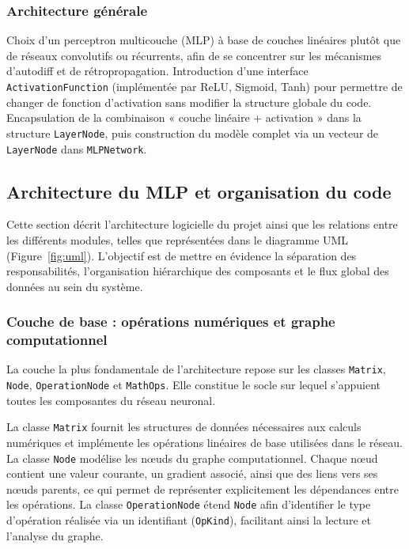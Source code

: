 \documentclass[a4paper,11pt]{article}
\begin{document}
\subsubsection{Architecture générale}
Choix d'un perceptron multicouche (MLP) à base de couches linéaires plutôt que de réseaux convolutifs ou récurrents, afin de se concentrer sur les mécanismes d'autodiff et de rétropropagation. Introduction d'une interface \texttt{ActivationFunction} (implémentée par ReLU, Sigmoid, Tanh) pour permettre de changer de fonction d'activation sans modifier la structure globale du code. Encapsulation de la combinaison « couche linéaire + activation » dans la structure \texttt{LayerNode}, puis construction du modèle complet via un vecteur de \texttt{LayerNode} dans \texttt{MLPNetwork}.

\vspace{2cm}

\subsection{Architecture du MLP et organisation du code}
Cette section décrit l'architecture logicielle du projet ainsi que les relations entre les différents modules, telles que représentées dans le diagramme UML (Figure~\ref{fig:uml}). L'objectif est de mettre en évidence la séparation des responsabilités, l'organisation hiérarchique des composants et le flux global des données au sein du système.

\subsubsection{Couche de base : opérations numériques et graphe computationnel}
La couche la plus fondamentale de l'architecture repose sur les classes \texttt{Matrix}, \texttt{Node}, \texttt{OperationNode} et \texttt{MathOps}. Elle constitue le socle sur lequel s'appuient toutes les composantes du réseau neuronal.

La classe \texttt{Matrix} fournit les structures de données nécessaires aux calculs numériques et implémente les opérations linéaires de base utilisées dans le réseau. La classe \texttt{Node} modélise les nœuds du graphe computationnel. Chaque nœud contient une valeur courante, un gradient associé, ainsi que des liens vers ses nœuds parents, ce qui permet de représenter explicitement les dépendances entre les opérations. La classe \texttt{OperationNode} étend \texttt{Node} afin d'identifier le type d'opération réalisée via un identifiant (\texttt{OpKind}), facilitant ainsi la lecture et l'analyse du graphe.
\end{document}
